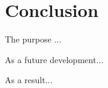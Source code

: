 \chapter{Conclusion}
\label{conclusion}


The purpose ...

As a future development...

As a result...
